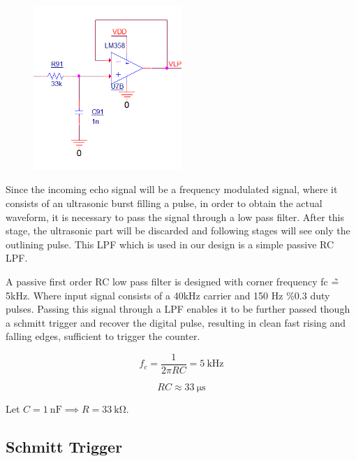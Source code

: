 \documentclass[12pt, a4paper]{article}
\begin{document}
            \begin{figure}[H]\centering
                \includegraphics[width=0.5\textwidth]{schematics/lowpass.png}
                \caption[]{}
            \end{figure}
                
            Since the incoming echo signal will be a frequency modulated signal, where it consists of an ultrasonic burst filling a pulse, in order to obtain the actual waveform, it is necessary to pass the signal through a low pass filter. 
            After this stage, the ultrasonic part will be discarded and following stages will see only the outlining pulse. This LPF which is used in our design is a simple passive RC LPF.
            
            \bigskip
            A passive first order RC low pass filter is designed with corner frequency fc \~= 5kHz. Where input signal consists of a 40kHz carrier and 150 Hz \%0.3 duty pulses. Passing this signal through a LPF enables it to be further passed though a schmitt trigger and recover the digital pulse, resulting in clean fast rising and falling edges, sufficient to trigger the counter.

            \begin{equation}
                f_c = \frac{1}{2 \pi R C} = \SI{5}{\kilo\hertz} 
            \end{equation}

            \begin{equation}
                RC \approx \SI{33}{\micro\second}
            \end{equation}

            \noindent Let $C = \SI{1}{\nano\farad} \implies R = \SI{33}{\kilo\ohm}$.

        \subsection{Schmitt Trigger}
\end{document}
